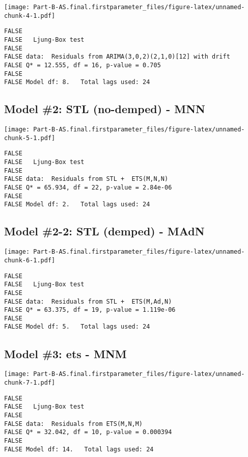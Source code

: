 \documentclass[openany]{book}
\begin{document}
\texttt{[image: Part-B-AS.final.firstparameter\_files/figure-latex/unnamed-chunk-4-1.pdf]}

\begin{verbatim}
FALSE 
FALSE   Ljung-Box test
FALSE 
FALSE data:  Residuals from ARIMA(3,0,2)(2,1,0)[12] with drift
FALSE Q* = 12.555, df = 16, p-value = 0.705
FALSE 
FALSE Model df: 8.   Total lags used: 24
\end{verbatim}

\subsection{Model \#2: STL (no-demped) -
MNN}\label{model-2-stl-no-demped---mnn}

\texttt{[image: Part-B-AS.final.firstparameter\_files/figure-latex/unnamed-chunk-5-1.pdf]}

\begin{verbatim}
FALSE 
FALSE   Ljung-Box test
FALSE 
FALSE data:  Residuals from STL +  ETS(M,N,N)
FALSE Q* = 65.934, df = 22, p-value = 2.84e-06
FALSE 
FALSE Model df: 2.   Total lags used: 24
\end{verbatim}

\subsection{Model \#2-2: STL (demped) -
MAdN}\label{model-2-2-stl-demped---madn}

\texttt{[image: Part-B-AS.final.firstparameter\_files/figure-latex/unnamed-chunk-6-1.pdf]}

\begin{verbatim}
FALSE 
FALSE   Ljung-Box test
FALSE 
FALSE data:  Residuals from STL +  ETS(M,Ad,N)
FALSE Q* = 63.375, df = 19, p-value = 1.119e-06
FALSE 
FALSE Model df: 5.   Total lags used: 24
\end{verbatim}

\subsection{Model \#3: ets - MNM}\label{model-3-ets---mnm}

\texttt{[image: Part-B-AS.final.firstparameter\_files/figure-latex/unnamed-chunk-7-1.pdf]}

\begin{verbatim}
FALSE 
FALSE   Ljung-Box test
FALSE 
FALSE data:  Residuals from ETS(M,N,M)
FALSE Q* = 32.042, df = 10, p-value = 0.000394
FALSE 
FALSE Model df: 14.   Total lags used: 24
\end{verbatim}
\end{document}
